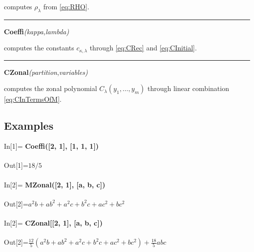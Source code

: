 \documentclass[10pt,oneside,american]{amsart}
\numberwithin{equation}{section}
\numberwithin{figure}{section}
\theoremstyle{definition}
\theoremstyle{remark}
\theoremstyle{plain}
\theoremstyle{definition}
\theoremstyle{plain}
\begin{document}
\noindent \begin{flushleft}
computes $\rho_{\lambda}$ from \eqref{eq:RHO}.
\par\end{flushleft}

\noindent \begin{flushleft}
\rule[0.5ex]{1\columnwidth}{1pt}
\par\end{flushleft}

\noindent \begin{flushleft}
\textbf{Coeffi}\emph{(kappa,lambda)}
\par\end{flushleft}

\noindent \begin{flushleft}
computes the constants $c_{\kappa,\lambda}$ through \eqref{eq:CRec}
and \eqref{eq:CInitial}.
\par\end{flushleft}

\noindent \begin{flushleft}
\rule[0.5ex]{1\columnwidth}{1pt}
\par\end{flushleft}

\noindent \begin{flushleft}
\textbf{CZonal}\emph{(partition},\emph{variables)}
\par\end{flushleft}

\noindent \begin{flushleft}
computes the zonal polynomial $C_{\lambda}\left(y_{1},\ldots,y_{m}\right)$
through linear combination \eqref{eq:CInTermsOfM}.
\par\end{flushleft}

\subsection{Examples}
\noindent \begin{flushleft}
In{[}1{]}= \textbf{Coeffi({[}2, 1{]}, {[}1, 1, 1{]})}\\
~\\
Out{[}1{]}=$18/5$\\
~\\
In{[}2{]}= \textbf{MZonal({[}2, 1{]}, {[}a, b, c{]})}\\
~\\
Out{[}2{]}=$a^{2}b+ab^{2}+a^{2}c+b^{2}c+ac^{2}+bc^{2}$\\
~\\
In{[}2{]}= \textbf{CZonal{[}{[}2, 1{]}, {[}a, b, c{]})}\\
~\\
Out{[}2{]}=$\frac{12}{5}\left(a^{2}b+ab^{2}+a^{2}c+b^{2}c+ac^{2}+bc^{2}\right)+\frac{18}{5}abc$
\par\end{flushleft}
\end{document}
